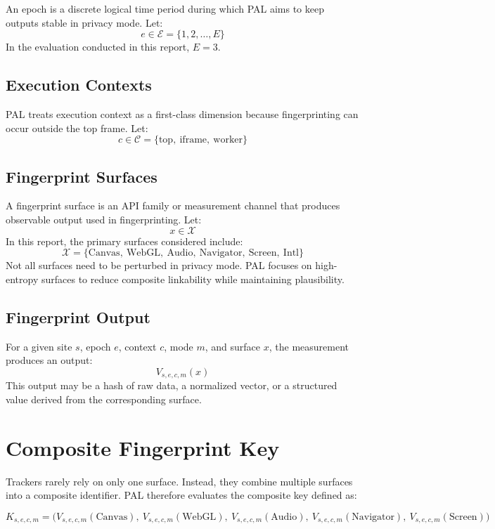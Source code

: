 \documentclass[11pt]{report}
\begin{document}
An epoch is a discrete logical time period during which PAL aims to keep outputs stable in privacy mode. Let:
\[
e \in \mathcal{E} = \{1, 2, \dots, E\}
\]
In the evaluation conducted in this report, $E = 3$.

\subsection{Execution Contexts}

PAL treats execution context as a first-class dimension because fingerprinting can occur outside the top frame. Let:
\[
c \in \mathcal{C} = \{\text{top},\ \text{iframe},\ \text{worker}\}
\]

\subsection{Fingerprint Surfaces}

A fingerprint surface is an API family or measurement channel that produces observable output used in fingerprinting. Let:
\[
x \in \mathcal{X}
\]
In this report, the primary surfaces considered include:
\[
\mathcal{X} = \{\text{Canvas},\ \text{WebGL},\ \text{Audio},\ \text{Navigator},\ \text{Screen},\ \text{Intl}\}
\]
Not all surfaces need to be perturbed in privacy mode. PAL focuses on high-entropy surfaces to reduce composite linkability while maintaining plausibility.

\subsection{Fingerprint Output}

For a given site $s$, epoch $e$, context $c$, mode $m$, and surface $x$, the measurement produces an output:
\[
V_{s,e,c,m}(x)
\]
This output may be a hash of raw data, a normalized vector, or a structured value derived from the corresponding surface.

\section{Composite Fingerprint Key}

Trackers rarely rely on only one surface. Instead, they combine multiple surfaces into a composite identifier. PAL therefore evaluates the composite key defined as:

\[
K_{s,e,c,m} = \big(V_{s,e,c,m}(\text{Canvas}),\ V_{s,e,c,m}(\text{WebGL}),\ V_{s,e,c,m}(\text{Audio}),\ V_{s,e,c,m}(\text{Navigator}),\ V_{s,e,c,m}(\text{Screen})\big)
\]
\end{document}
